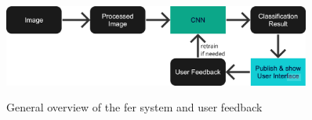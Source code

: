 \begin{enumerate}
\begin{figure}[h]
\centering
\includegraphics[width=0.9\textwidth]{images/fer-user-feedback.png}\\
\caption{General overview of the \acrshort{fer} system and user feedback}\label{fig:userfb}
\end{figure}

\end{enumerate}
\newpage

